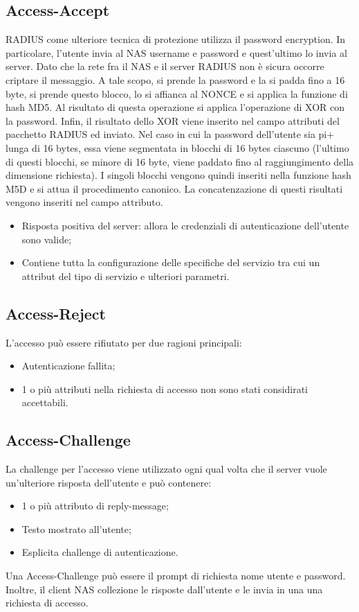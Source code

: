 \documentclass{article}
\theoremstyle{remark}
\begin{document}
\subsection{Access-Accept}
RADIUS come ulteriore tecnica di protezione utilizza il password encryption. In particolare, l'utente invia al NAS username e password e quest'ultimo lo invia al server. Dato che la rete fra il NAS e il server RADIUS non è sicura occorre criptare il messaggio.\newline
A tale scopo, si prende la password e la si padda fino a 16 byte, si prende questo blocco, lo si affianca al NONCE e si applica la funzione di hash MD5. Al risultato di questa operazione si applica l'operazione di XOR con la password. Infin, il risultato dello XOR viene inserito nel campo attributi del pacchetto RADIUS ed inviato.\newline
Nel caso in cui la password dell'utente sia pi+ lunga di 16 bytes, essa viene segmentata in blocchi di 16 bytes ciascuno (l'ultimo di questi blocchi, se minore di 16 byte, viene paddato fino al raggiungimento della dimensione richiesta). I singoli blocchi vengono quindi inseriti nella funzione hash M5D e si attua il procedimento canonico. La concatenzazione di questi risultati vengono inseriti nel campo attributo.
\begin{itemize}
    \item Risposta positiva del server: allora le credenziali di autenticazione dell'utente sono valide;
    \item Contiene tutta la configurazione delle specifiche del servizio tra cui un attribut del tipo di servizio e ulteriori parametri.
\end{itemize}
\subsection{Access-Reject}
L'accesso può essere rifiutato per due ragioni principali:\begin{itemize}
    \item Autenticazione fallita;
    \item 1 o più attributi nella richiesta di accesso non sono stati considirati accettabili.
\end{itemize}
\subsection{Access-Challenge}
La challenge per l'accesso viene utilizzato ogni qual volta che il server vuole un'ulteriore risposta dell'utente e può contenere:\begin{itemize}
    \item 1 o più attributo di reply-message;
    \item Testo mostrato all'utente;
    \item Esplicita challenge di autenticazione.
\end{itemize} Una Access-Challenge può essere il prompt di richiesta nome utente e password.\newline
Inoltre, il client NAS collezione le risposte dall'utente e le invia in una una richiesta di accesso.
\end{document}
